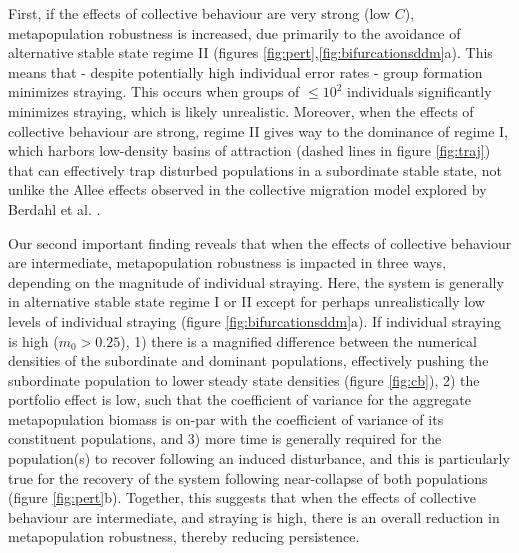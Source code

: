 \documentclass{revtex4}
\begin{document}
First, if the effects of collective behaviour are very strong (low $C$), metapopulation robustness is increased, due primarily to the avoidance of alternative stable state regime II (figures \ref{fig:pert},\ref{fig:bifurcationsddm}a).
This means that - despite potentially high individual error rates - group formation minimizes straying. 
This occurs when groups of $\leq 10^2$ individuals significantly minimizes straying, which is likely unrealistic.
Moreover, when the effects of collective behaviour are strong, regime II gives way to the dominance of regime I, which harbors low-density basins of attraction (dashed lines in figure \ref{fig:traj}) that can effectively trap disturbed populations in a subordinate stable state, not unlike the Allee effects observed in the collective migration model explored by Berdahl et al. \citep{Berdahl:2016dx}.


Our second important finding reveals that when the effects of collective behaviour are intermediate, metapopulation robustness is impacted in three ways, depending on the magnitude of individual straying.
Here, the system is generally in alternative stable state regime I or II except for perhaps unrealistically low levels of individual straying (figure \ref{fig:bifurcationsddm}a).
If individual straying is high ($m_0>0.25$),
1) there is a magnified difference between the numerical densities of the subordinate and dominant populations, effectively pushing the subordinate population to lower steady state densities (figure \ref{fig:cb}),
2) the portfolio effect is low, such that the coefficient of variance for the aggregate metapopulation biomass is on-par with the coefficient of variance of its constituent populations, and
3) more time is generally required for the population(s) to recover following an induced disturbance, and this is particularly true for the recovery of the system following near-collapse of both populations (figure \ref{fig:pert}b).
Together, this suggests that when the effects of collective behaviour are intermediate, and straying is high, there is an overall reduction in metapopulation robustness, thereby reducing persistence.
\end{document}

